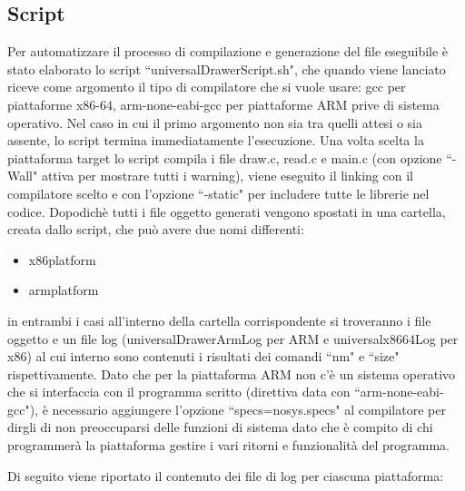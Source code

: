 \documentclass{article}
\begin{document}
	\subsection{Script}
	Per automatizzare il processo di compilazione e generazione del file eseguibile è stato elaborato lo script ``universalDrawerScript.sh", che quando viene lanciato riceve come argomento il tipo di compilatore che si vuole usare: gcc per piattaforme x86-64, arm-none-eabi-gcc per piattaforme ARM prive di sistema operativo. Nel caso in cui il primo argomento non sia tra quelli attesi o sia assente, lo script termina immediatamente l'esecuzione.
	\newline
	Una volta scelta la piattaforma target lo script compila i file draw.c, read.c e main.c (con opzione ``-Wall" attiva per mostrare tutti i warning), viene eseguito il linking con il compilatore scelto e con l'opzione ``-static" per includere tutte le librerie nel codice. Dopodichè tutti i file oggetto generati vengono spostati in una cartella, creata dallo script, che può avere due nomi differenti:
	\begin{itemize}
		\item x86\textunderscore platform 
		\item arm\textunderscore platform 
	\end{itemize}
in entrambi i casi all'interno della cartella corrispondente si troveranno i file oggetto e un file log (universalDrawerArmLog per ARM e universalx86\textunderscore 64Log per x86) al cui interno sono contenuti i risultati dei comandi ``nm" e ``size" rispettivamente.
\newline
Dato che per la piattaforma ARM non c'è un sistema operativo che si interfaccia con il programma scritto  (direttiva data con ``arm-none-eabi-gcc"), è necessario aggiungere l'opzione ``specs=nosys.specs" al compilatore per dirgli di non preoccuparsi delle funzioni di sistema dato che è compito di chi programmerà la piattaforma gestire i vari ritorni e funzionalità del programma.

Di seguito viene riportato il contenuto dei file di log per ciascuna piattaforma:
\end{document}
